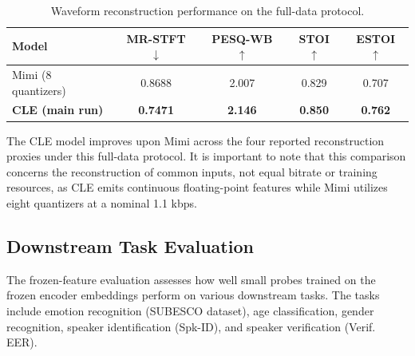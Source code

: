 \begin{table}[htbp]
    \centering
    \caption{Waveform reconstruction performance on the full-data protocol.}
    \label{tab:reconstruction}
    \renewcommand{\arraystretch}{1.3}
    \begin{tabular}{l c c c c}
        \toprule
        \textbf{Model} & \textbf{MR-STFT $\downarrow$} & \textbf{PESQ-WB $\uparrow$} & \textbf{STOI $\uparrow$} & \textbf{ESTOI $\uparrow$} \\
        \midrule
        Mimi (8 quantizers) & 0.8688 & 2.007 & 0.829 & 0.707 \\
        \textbf{CLE (main run)} & \textbf{0.7471} & \textbf{2.146} & \textbf{0.850} & \textbf{0.762} \\
        \bottomrule
    \end{tabular}
\end{table}

The CLE model improves upon Mimi across the four reported reconstruction proxies under this full-data protocol. It is important to note that this comparison concerns the reconstruction of common inputs, not equal bitrate or training resources, as CLE emits continuous floating-point features while Mimi utilizes eight quantizers at a nominal 1.1 kbps.

\subsection{Downstream Task Evaluation}
The frozen-feature evaluation assesses how well small probes trained on the frozen encoder embeddings perform on various downstream tasks. The tasks include emotion recognition (SUBESCO dataset), age classification, gender recognition, speaker identification (Spk-ID), and speaker verification (Verif. EER).

